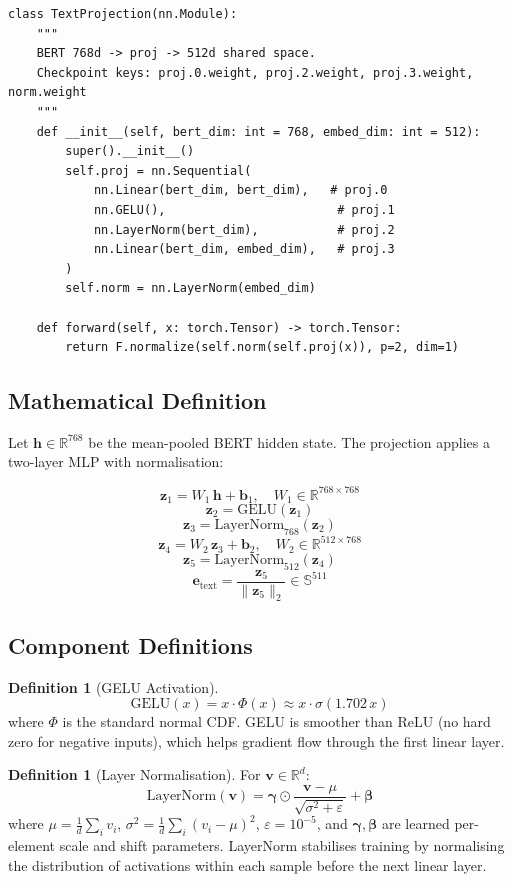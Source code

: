 \documentclass[12pt,a4paper]{article}
\theoremstyle{definition}
\newtheorem{definition}[theorem]{Definition}
\theoremstyle{remark}
\begin{document}
\begin{lstlisting}[caption={\texttt{TextProjection} class}]
class TextProjection(nn.Module):
    """
    BERT 768d -> proj -> 512d shared space.
    Checkpoint keys: proj.0.weight, proj.2.weight, proj.3.weight, norm.weight
    """
    def __init__(self, bert_dim: int = 768, embed_dim: int = 512):
        super().__init__()
        self.proj = nn.Sequential(
            nn.Linear(bert_dim, bert_dim),   # proj.0
            nn.GELU(),                        # proj.1
            nn.LayerNorm(bert_dim),           # proj.2
            nn.Linear(bert_dim, embed_dim),   # proj.3
        )
        self.norm = nn.LayerNorm(embed_dim)

    def forward(self, x: torch.Tensor) -> torch.Tensor:
        return F.normalize(self.norm(self.proj(x)), p=2, dim=1)
\end{lstlisting}

\subsection{Mathematical Definition}

Let $\mathbf{h} \in \mathbb{R}^{768}$ be the mean-pooled BERT hidden state.
The projection applies a two-layer MLP with normalisation:

\[
  \mathbf{z}_1 = W_1\,\mathbf{h} + \mathbf{b}_1,
  \quad W_1 \in \mathbb{R}^{768 \times 768}
\]
\[
  \mathbf{z}_2 = \text{GELU}(\mathbf{z}_1)
\]
\[
  \mathbf{z}_3 = \text{LayerNorm}_{768}(\mathbf{z}_2)
\]
\[
  \mathbf{z}_4 = W_2\,\mathbf{z}_3 + \mathbf{b}_2,
  \quad W_2 \in \mathbb{R}^{512 \times 768}
\]
\[
  \mathbf{z}_5 = \text{LayerNorm}_{512}(\mathbf{z}_4)
\]
\[
  \boxed{
    \mathbf{e}_{\text{text}} = \frac{\mathbf{z}_5}{\|\mathbf{z}_5\|_2}
    \in \mathbb{S}^{511}
  }
\]

\subsection{Component Definitions}

\begin{definition}[GELU Activation]
\[
  \text{GELU}(x) = x \cdot \Phi(x) \approx x \cdot \sigma(1.702\,x)
\]
where $\Phi$ is the standard normal CDF.
GELU is smoother than ReLU (no hard zero for negative inputs), which helps
gradient flow through the first linear layer.
\end{definition}

\begin{definition}[Layer Normalisation]
For $\mathbf{v} \in \mathbb{R}^d$:
\[
  \text{LayerNorm}(\mathbf{v})
  = \boldsymbol{\gamma} \odot
    \frac{\mathbf{v} - \mu}{\sqrt{\sigma^2 + \varepsilon}}
    + \boldsymbol{\beta}
\]
where $\mu = \frac{1}{d}\sum_i v_i$,
$\sigma^2 = \frac{1}{d}\sum_i (v_i - \mu)^2$,
$\varepsilon = 10^{-5}$, and $\boldsymbol{\gamma}, \boldsymbol{\beta}$ are
learned per-element scale and shift parameters.
LayerNorm stabilises training by normalising the distribution of
activations within each sample before the next linear layer.
\end{definition}
\end{document}
